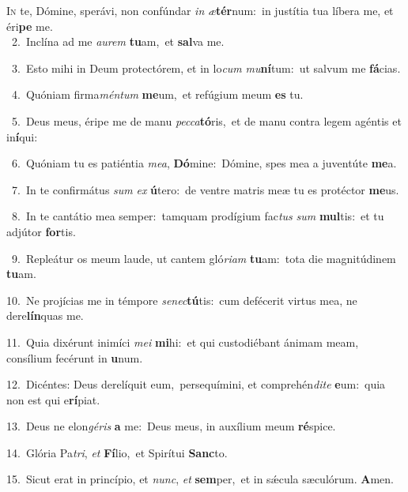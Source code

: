 \lettrine{\initial\textcolor{\initialcolor}{I}}{n} te, Dómine, sperávi, non confúndar \textit{in} \textit{æ}\-\textbf{tér}num:~\star in justítia tua líbera me, et éri\textbf{pe} me.\\
{\numbfont\textcolor{\numbcolor}{~2.}}~Inclína ad me \textit{au}\-\textit{rem} \textbf{tu}\-am,~\star et \textbf{sal}\-va me.\par
{\numbfont\textcolor{\numbcolor}{~3.}}~Esto mihi in Deum protectórem, et in lo\textit{cum} \textit{mu}\-\textbf{ní}tum:~\star ut salvum me \textbf{fá}\-cias.\par
{\numbfont\textcolor{\numbcolor}{~4.}}~Quóniam firma\-\textit{mén}\-\textit{tum} \textbf{me}\-um,~\star et refúgium meum \textbf{es} tu.\par
{\numbfont\textcolor{\numbcolor}{~5.}}~Deus meus, éripe me de manu \textit{pec}\-\textit{ca}\textbf{tó}ris,~\star et de manu contra legem agéntis et in\-\textbf{í}\-qui:\par
{\numbfont\textcolor{\numbcolor}{~6.}}~Quóniam tu es patiéntia \textit{me}\-\textit{a}, \textbf{Dó}\-mine:~\star Dómine, spes mea a juventúte \textbf{me}\-a.\par
{\numbfont\textcolor{\numbcolor}{~7.}}~In te confirmátus \textit{sum} \textit{ex} \textbf{ú}\-tero:~\star de ventre matris meæ tu es protéctor \textbf{me}\-us.\par
{\numbfont\textcolor{\numbcolor}{~8.}}~In te cantátio mea semper:~\dagger tamquam prodígium fac\textit{tus} \textit{sum} \textbf{mul}\-tis:~\star et tu adjútor \textbf{for}\-tis.\par
{\numbfont\textcolor{\numbcolor}{~9.}}~Repleátur os meum laude, ut cantem gló\-\textit{ri}\-\textit{am} \textbf{tu}\-am:~\star tota die magnitúdinem \textbf{tu}\-am.\par
{\numbfont\textcolor{\numbcolor}{10.}}~Ne projícias me in témpore \textit{se}\-\textit{nec}\textbf{tú}tis:~\star cum defécerit virtus mea, ne dere\-\textbf{lín}\-quas me.\par
{\numbfont\textcolor{\numbcolor}{11.}}~Quia dixérunt inimíci \textit{me}\-\textit{i} \textbf{mi}\-hi:~\star et qui custodiébant ánimam meam, consílium fecérunt in \textbf{u}\-num.\par
{\numbfont\textcolor{\numbcolor}{12.}}~Dicéntes: Deus derelíquit eum,~\dagger persequímini, et comprehén\-\textit{di}\-\textit{te} \textbf{e}\-um:~\star quia non est qui e\-\textbf{rí}\-piat.\par
{\numbfont\textcolor{\numbcolor}{13.}}~Deus ne elon\-\textit{gé}\-\textit{ris} \textbf{a} me:~\star Deus meus, in auxílium meum \textbf{ré}\-spice.\par
{\numbfont\textcolor{\numbcolor}{14.}}~Glória Pa\-\textit{tri}\-, \textit{et} \textbf{Fí}\-lio,~\star et Spirítui \textbf{Sanc}\-to.\par
{\numbfont\textcolor{\numbcolor}{15.}}~Sicut erat in princípio, et \textit{nunc}\-, \textit{et} \textbf{sem}\-per,~\star et in sǽcula sæculórum. \textbf{A}\-men.\par
